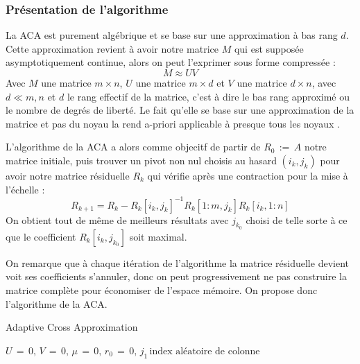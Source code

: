 \documentclass[10pt]{SelfArx} %
\begin{document}
\subsubsection{Présentation de l'algorithme}
La ACA est purement algébrique et se base sur une approximation à bas rang $d$. Cette approximation revient à avoir notre matrice $M$ qui est supposée asymptotiquement continue, alors on peut l'exprimer sous forme compressée \cite{bebendorf_hierarchical_2008} :
\begin{equation}
    M \approx UV
\end{equation}
Avec $M$ une matrice $m \times n$, $U$ une matrice $m \times d$ et $V$ une matrice $d \times n$, avec $d \ll m,n$ et $d$ le rang effectif de la matrice, c'est à dire le bas rang approximé ou le nombre de degrés de liberté.
Le fait qu'elle se base sur une approximation de la matrice et pas du noyau la rend a-priori applicable à presque tous les noyaux \cite{bebendorf_hierarchical_2008}.

L'algorithme de la ACA a alors comme objecitf de partir de $R_0 \, := \, A$ notre matrice initiale, puis trouver un pivot non nul choisis au hasard $(i_k,j_k)$ pour avoir notre matrice résiduelle $R_k$ qui vérifie après une contraction pour la mise à l'échelle \cite{bebendorf_hierarchical_2008}:
\begin{equation}
    R_{k+1} = R_k - R_k[i_k,j_k]^{-1}R_k[1:m,j_k]R_k[i_k,1:n]
\end{equation}
On obtient tout de même de meilleurs résultats avec $j_{k_0}$ choisi de telle sorte à ce que le coefficient $R_k[i_k,j_{k_0}]$ soit maximal.

On remarque que à chaque itération de l'algorithme la matrice résiduelle devient voit ses coefficients s'annuler, donc on peut progressivement ne pas construire la matrice complète pour économiser de l'espace mémoire\cite{bebendorf_hierarchical_2008}. On propose donc l'algorithme de la ACA.
\begin{algorithm}
    \caption{Adaptive Cross Approximation}
    
    
    $U \, = \, 0, \, V \, = \, 0, \, \mu \, = \, 0, \, r_0 \, = \, 0, \, j_1 \, \text{index aléatoire de colonne}$
    
\end{algorithm}
\end{document}
